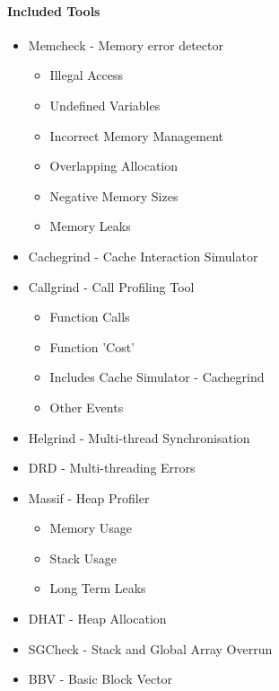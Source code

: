 \paragraph{Included Tools}
\begin{itemize}
\item Memcheck - Memory error detector \footnotemark[1]
  \begin{itemize}
  \item Illegal Access
  \item Undefined Variables
  \item Incorrect Memory Management
  \item Overlapping Allocation
  \item Negative Memory Sizes
  \item Memory Leaks
  \end{itemize}
\item Cachegrind - Cache Interaction Simulator
\item Callgrind - Call Profiling Tool \footnotemark[1]
  \begin{itemize}
  \item Function Calls
  \item Function 'Cost'
  \item Includes Cache Simulator - Cachegrind
  \item Other Events
  \end{itemize}
\item Helgrind - Multi-thread Synchronisation \footnotemark[1]
\item DRD - Multi-threading Errors \footnotemark[1]
\item Massif - Heap Profiler \footnotemark[1]
  \begin{itemize}
  \item Memory Usage
  \item Stack Usage
  \item Long Term Leaks
  \end{itemize}
\item DHAT - Heap Allocation \footnotemark[2]
\item SGCheck - Stack and Global Array Overrun
\item BBV - Basic Block Vector \footnotemark[2]
\end{itemize}




























































